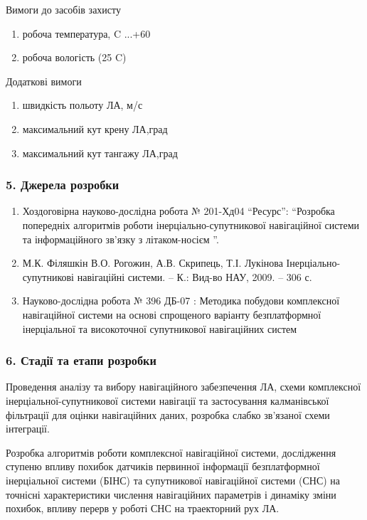 Вимоги до засобів захисту
\begin{enumerate}
    \item робоча температура, C     ...+60
    \item робоча вологість (25 C)    
\end{enumerate}

Додаткові вимоги
\begin{enumerate}
    \item швидкість польоту ЛА, м/с         
    \item максимальний кут крену ЛА,град   
    \item максимальний кут тангажу ЛА,град 
\end{enumerate}
\subsubsection*{5. Джерела розробки}
\begin{enumerate}
 \item Хоздоговірна науково-дослідна робота № 201-Хд04 “Ресурс”: “Розробка 
попередніх алгоритмів роботи інерціально-супутникової навігаційної 
системи та інформаційного зв'язку з літаком-носієм ”.
 \item М.К. Філяшкін В.О. Рогожин, А.В. Скрипець, Т.І. Лукінова 
Інерціально-супутникові навігаційні  системи. – К.: Вид-во НАУ, 2009. – 306 с.
 \item Науково-дослідна робота  № 396 ДБ-07 : Методика побудови 
комплексної навігаційної системи на основі спрощеного варіанту 
безплатформної інерціальної та високоточної супутникової навігаційних систем
\end{enumerate}
\subsubsection*{6. Стадії та етапи розробки}
Проведення аналізу та вибору навігаційного забезпечення ЛА, 
схеми комплексної інерціальної-супутникової системи навігації 
та застосування калманівської фільтрації для оцінки навігаційних 
даних, розробка слабко зв’язаної схеми інтеграції.

Розробка алгоритмів роботи комплексної навігаційної системи, 
дослідження ступеню впливу похибок датчиків первинної інформації  
безплатформної інерціальної системи (БІНС) та супутникової 
навігаційної системи (СНС) на точнісні характеристики числення 
навігаційних параметрів і динаміку зміни похибок, впливу перерв 
у роботі СНС на траекторний рух ЛА.

